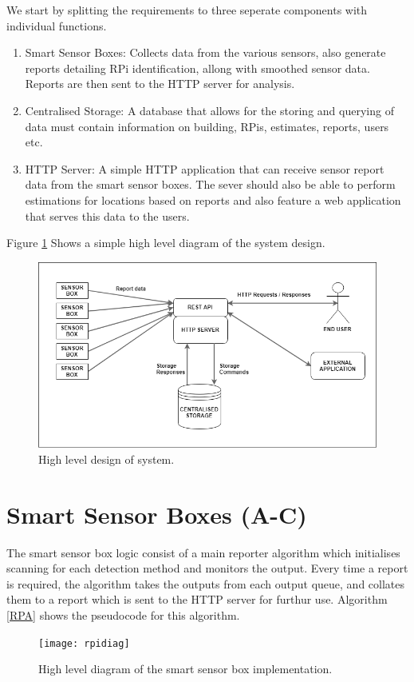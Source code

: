 \documentclass{l4proj}
\begin{document}
We start by splitting the requirements to three seperate components with individual functions.
\begin{enumerate}
  \item Smart Sensor Boxes:
	Collects data from the various sensors, also generate reports detailing RPi identification, allong with smoothed sensor data. Reports are then sent to the HTTP server for analysis. 
  \item Centralised Storage:
	A database that allows for the storing and querying of data must contain information on building, RPis, estimates, reports, users etc.
  \item HTTP Server:
	A simple HTTP application that can receive sensor report data from the smart sensor boxes. The sever should also be able to perform estimations for locations based on reports and also feature a web application that serves this data to the users. 
\end{enumerate}
Figure \ref{fig:overalldiag} Shows a simple high level diagram of the system design.
\begin{figure}
\centering
\includegraphics[width=\textwidth]{overalldiag}
\caption{High level design of system.}
\label{fig:overalldiag}
\end{figure}


\section{Smart Sensor Boxes (A-C)}
The smart sensor box logic consist of a main reporter algorithm which initialises scanning for each detection method and monitors the output. Every time a report is required, the algorithm takes the outputs from each output queue, and collates them to a report which is sent to the HTTP server for furthur use.  Algorithm \ref{RPA} shows the pseudocode for this algorithm.
\begin{figure}
\centering
\texttt{[image: rpidiag]}
\caption{High level diagram of the smart sensor box implementation.}
\label{fig:rpidiag}
\end{figure}
\end{document}
